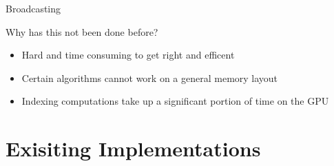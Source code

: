 \documentclass[utf8x,xcolor=pdftex,dvipsnames,table]{beamer}
\begin{document}
\begin{frame}{Broadcasting}
\begin{center}
\end{center}
\end{frame}

\begin{frame}{Why has this not been done before?}
\begin{itemize}
\item Hard and time consuming to get right and efficent
\item Certain algorithms cannot work on a general memory layout
\item Indexing computations take up a significant portion of time on the GPU
\end{itemize}
\end{frame}

\section{Exisiting Implementations}
\end{document}
